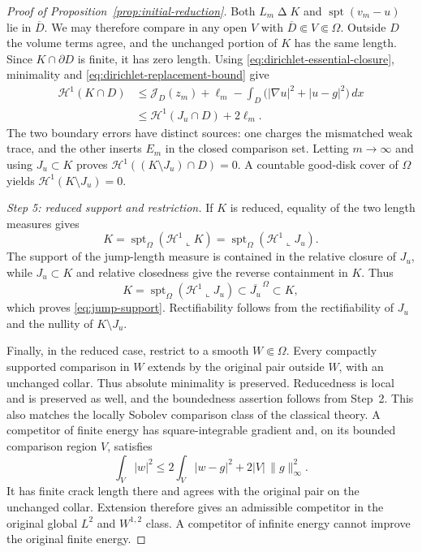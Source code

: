 \begin{proof}[Proof of Proposition~\ref{prop:initial-reduction}]
Both $L_m\mathbin\Delta K$ and $\operatorname{spt}(v_m-u)$ lie
in $\overline D$.
We may therefore compare in any open
$V$ with $\overline D\Subset V\Subset\Omega$.
Outside $D$ the volume terms agree, and the unchanged portion
of $K$ has the same length.
Since $K\cap\partial D$ is finite, it has zero length.
Using \eqref{eq:dirichlet-essential-closure}, minimality and
\eqref{eq:dirichlet-replacement-bound} give
\begin{align*}
 \mathcal H^1(K\cap D)
 &\le \mathcal J_D(z_m)+\ell_m
       -\int_D\bigl(|\nabla u|^2+|u-g|^2\bigr)\,dx\\
 &\le \mathcal H^1(J_u\cap D)+2\ell_m.
\end{align*}
The two boundary errors have distinct sources: one charges
the mismatched weak trace, and the other inserts $E_m$ in the
closed comparison set.
Letting $m\to\infty$ and using $J_u\subset K$ proves
$\mathcal H^1((K\setminus J_u)\cap D)=0$.
A countable good-disk cover of $\Omega$ yields
$\mathcal H^1(K\setminus J_u)=0$.

\smallskip
\noindent\emph{Step 5: reduced support and restriction.}
If $K$ is reduced, equality of the two length measures gives
\[
 K=\operatorname{spt}_{\Omega}(\mathcal H^1\!\llcorner K)
   =\operatorname{spt}_{\Omega}(\mathcal H^1\!\llcorner J_u).
\]
The support of the jump-length measure is contained in the relative
closure of $J_u$, while $J_u\subset K$ and relative closedness give the
reverse containment in $K$. Thus
\[
 K=\operatorname{spt}_{\Omega}(\mathcal H^1\!\llcorner J_u)
 \subset\overline{J_u}^{\,\Omega}\subset K,
\]
which proves \eqref{eq:jump-support}.
Rectifiability follows from the rectifiability of $J_u$ and the
nullity of $K\setminus J_u$.

Finally, in the reduced case, restrict to a smooth $W\Subset\Omega$.
Every compactly supported comparison in $W$ extends by the
original pair outside $W$, with an unchanged collar.
Thus absolute minimality is preserved.
Reducedness is local and is preserved as well, and the
boundedness assertion follows from Step~2.
This also matches the locally Sobolev comparison class of the classical
theory. A competitor of finite energy has square-integrable gradient and,
on its bounded comparison region $V$, satisfies
\[
 \int_V |w|^2\leq
 2\int_V|w-g|^2+2|V|\,\|g\|_\infty^2.
\]
It has finite crack length there and agrees with the original pair on the
unchanged collar. Extension therefore gives an admissible competitor in
the original global $L^2$ and $W^{1,2}$ class. A competitor of infinite
energy cannot improve the original finite energy.
\end{proof}

